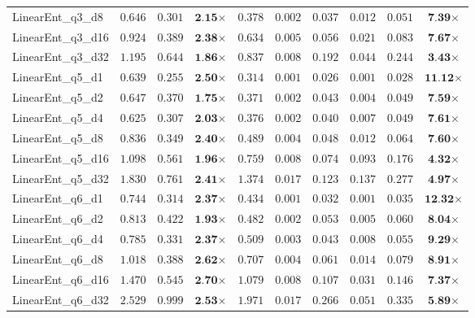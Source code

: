 \begin{table*}[t]
{\begin{tabular}{| l || r r c || r r r r r c |}
LinearEnt\_q3\_d8 & $0.646$ & $0.301$ & $\textbf{2.15}$$\times$ & $0.378$ & $0.002$ & $0.037$ & $0.012$ & $0.051$ & $\textbf{7.39}$$\times$ \\
LinearEnt\_q3\_d16 & $0.924$ & $0.389$ & $\textbf{2.38}$$\times$ & $0.634$ & $0.005$ & $0.056$ & $0.021$ & $0.083$ & $\textbf{7.67}$$\times$ \\
LinearEnt\_q3\_d32 & $1.195$ & $0.644$ & $\textbf{1.86}$$\times$ & $0.837$ & $0.008$ & $0.192$ & $0.044$ & $0.244$ & $\textbf{3.43}$$\times$ \\
LinearEnt\_q5\_d1 & $0.639$ & $0.255$ & $\textbf{2.50}$$\times$ & $0.314$ & $0.001$ & $0.026$ & $0.001$ & $0.028$ & $\textbf{11.12}$$\times$ \\
LinearEnt\_q5\_d2 & $0.647$ & $0.370$ & $\textbf{1.75}$$\times$ & $0.371$ & $0.002$ & $0.043$ & $0.004$ & $0.049$ & $\textbf{7.59}$$\times$ \\
LinearEnt\_q5\_d4 & $0.625$ & $0.307$ & $\textbf{2.03}$$\times$ & $0.376$ & $0.002$ & $0.040$ & $0.007$ & $0.049$ & $\textbf{7.61}$$\times$ \\
LinearEnt\_q5\_d8 & $0.836$ & $0.349$ & $\textbf{2.40}$$\times$ & $0.489$ & $0.004$ & $0.048$ & $0.012$ & $0.064$ & $\textbf{7.60}$$\times$ \\
LinearEnt\_q5\_d16 & $1.098$ & $0.561$ & $\textbf{1.96}$$\times$ & $0.759$ & $0.008$ & $0.074$ & $0.093$ & $0.176$ & $\textbf{4.32}$$\times$ \\
LinearEnt\_q5\_d32 & $1.830$ & $0.761$ & $\textbf{2.41}$$\times$ & $1.374$ & $0.017$ & $0.123$ & $0.137$ & $0.277$ & $\textbf{4.97}$$\times$ \\
LinearEnt\_q6\_d1 & $0.744$ & $0.314$ & $\textbf{2.37}$$\times$ & $0.434$ & $0.001$ & $0.032$ & $0.001$ & $0.035$ & $\textbf{12.32}$$\times$ \\
LinearEnt\_q6\_d2 & $0.813$ & $0.422$ & $\textbf{1.93}$$\times$ & $0.482$ & $0.002$ & $0.053$ & $0.005$ & $0.060$ & $\textbf{8.04}$$\times$ \\
LinearEnt\_q6\_d4 & $0.785$ & $0.331$ & $\textbf{2.37}$$\times$ & $0.509$ & $0.003$ & $0.043$ & $0.008$ & $0.055$ & $\textbf{9.29}$$\times$ \\
LinearEnt\_q6\_d8 & $1.018$ & $0.388$ & $\textbf{2.62}$$\times$ & $0.707$ & $0.004$ & $0.061$ & $0.014$ & $0.079$ & $\textbf{8.91}$$\times$ \\
LinearEnt\_q6\_d16 & $1.470$ & $0.545$ & $\textbf{2.70}$$\times$ & $1.079$ & $0.008$ & $0.107$ & $0.031$ & $0.146$ & $\textbf{7.37}$$\times$ \\
LinearEnt\_q6\_d32 & $2.529$ & $0.999$ & $\textbf{2.53}$$\times$ & $1.971$ & $0.017$ & $0.266$ & $0.051$ & $0.335$ & $\textbf{5.89}$$\times$ \\

\end{tabular}}
\end{table*}
